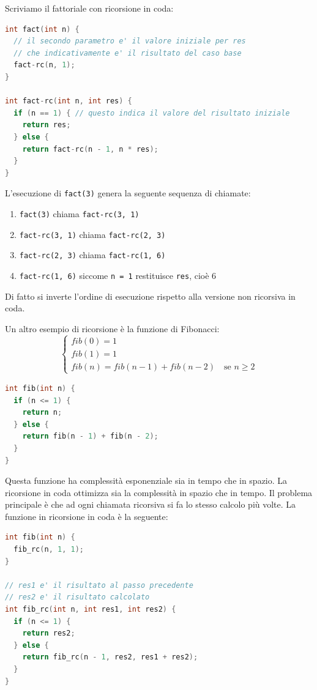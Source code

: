 \documentclass[a4paper]{article}
\begin{document}
\begin{example}
  Scriviamo il fattoriale con ricorsione in coda:
\begin{lstlisting}[language=c]
int fact(int n) {
  // il secondo parametro e' il valore iniziale per res
  // che indicativamente e' il risultato del caso base 
  fact-rc(n, 1);
}

int fact-rc(int n, int res) {
  if (n == 1) { // questo indica il valore del risultato iniziale
    return res;
  } else {
    return fact-rc(n - 1, n * res);
  }
}
\end{lstlisting}
  L'esecuzione di \texttt{fact(3)} genera la seguente sequenza di chiamate:
  \begin{enumerate}
    \item \texttt{fact(3)} chiama \texttt{fact-rc(3, 1)}
    \item \texttt{fact-rc(3, 1)} chiama \texttt{fact-rc(2, 3)}
    \item \texttt{fact-rc(2, 3)} chiama \texttt{fact-rc(1, 6)}
    \item \texttt{fact-rc(1, 6)} siccome \texttt{n = 1} restituisce
      \texttt{res}, cioè 6
  \end{enumerate}
  Di fatto si inverte l'ordine di esecuzione rispetto alla versione non ricorsiva in
  coda.
\end{example}

\begin{example}
  Un altro esempio di ricorsione è la funzione di Fibonacci:
  \[
    \begin{cases}
      fib(0) = 1 \\
      fib(1) = 1 \\
      fib(n) = fib(n-1) + fib(n-2) \quad \text{se } n \ge 2
    \end{cases}
  \] 
\begin{lstlisting}[language=c]
int fib(int n) {
  if (n <= 1) {
    return n;
  } else {
    return fib(n - 1) + fib(n - 2);
  }
}
\end{lstlisting}
  Questa funzione ha complessità esponenziale sia in tempo che in spazio. La ricorsione
  in coda ottimizza sia la complessità in spazio che in tempo.
  Il problema principale è che ad ogni chiamata ricorsiva si fa lo stesso calcolo
  più volte. La funzione in ricorsione in coda è la seguente:
\begin{lstlisting}[language=c]
int fib(int n) {
  fib_rc(n, 1, 1);
}

// res1 e' il risultato al passo precedente
// res2 e' il risultato calcolato
int fib_rc(int n, int res1, int res2) {
  if (n <= 1) {
    return res2;
  } else {
    return fib_rc(n - 1, res2, res1 + res2);
  }
}
\end{lstlisting}
\end{example}
\end{document}
